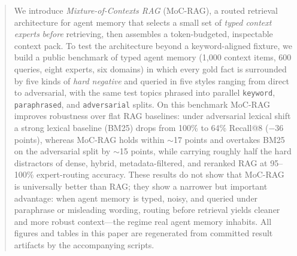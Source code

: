 \begin{abstract}
We introduce \emph{Mixture-of-Contexts RAG} (MoC-RAG), a routed retrieval
architecture for agent memory that selects a small set of \emph{typed context
experts} \emph{before} retrieving, then assembles a token-budgeted,
inspectable context pack. To test the architecture beyond a keyword-aligned
fixture, we build a public benchmark of typed agent memory (1{,}000 context
items, 600 queries, eight experts, six domains) in which every gold fact is
surrounded by five kinds of \emph{hard negative} and queried in five styles
ranging from direct to adversarial, with the same test topics phrased into
parallel \texttt{keyword}, \texttt{paraphrased}, and \texttt{adversarial}
splits. On this benchmark MoC-RAG improves robustness over flat RAG baselines:
under adversarial lexical shift a strong lexical baseline (BM25) drops from
100\% to 64\% Recall@8 ($-36$ points), whereas MoC-RAG holds within $\sim$17
points and overtakes BM25 on the adversarial split by $\sim$15 points, while
carrying roughly half the hard distractors of dense, hybrid, metadata-filtered,
and reranked RAG at 95--100\% expert-routing accuracy. These results do not show
that MoC-RAG is universally better than RAG; they show a narrower but important
advantage: when agent memory is typed, noisy, and queried under paraphrase or
misleading wording, routing before retrieval yields cleaner and more robust
context---the regime real agent memory inhabits. All figures and tables in this
paper are regenerated from committed result artifacts by the accompanying scripts.
\end{abstract}

